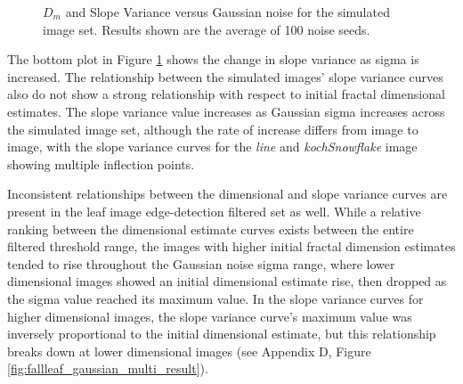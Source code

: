 \documentclass[12pt, oneside]{book}
\begin{document}
\begin{figure}[!b]
  \centering
  \caption[\(D_{m}\) and Slope Variance versus Gaussian noise for the simulated image set.]{\(D_{m}\) and Slope Variance versus Gaussian noise for the simulated image set.  Results shown are the average of 100 noise seeds.}
  \label{fig:simulated_gaussian_multi_result}
\end{figure}

The bottom plot in Figure \ref{fig:simulated_gaussian_multi_result} shows the change in slope variance as sigma is increased.  The relationship between the simulated images' slope variance curves also do not show a strong relationship with respect to initial fractal dimensional estimates.  The slope variance value increases as Gaussian sigma increases across the simulated image set, although the rate of increase differs from image to image, with the slope variance curves for the \textit{line} and \textit{kochSnowflake} image showing multiple inflection points.

Inconsistent relationships between the dimensional and slope variance curves are present in the leaf image edge-detection filtered set as well.  While a relative ranking between the dimensional estimate curves exists between the entire filtered threshold range, the images with higher initial fractal dimension estimates tended to rise throughout the Gaussian noise sigma range, where lower dimensional images showed an initial dimensional estimate rise, then dropped as the sigma value reached its maximum value.  In the slope variance curves for higher dimensional images, the slope variance curve's maximum value was inversely proportional to the initial dimensional estimate, but this relationship breaks down at lower dimensional images (see Appendix D, Figure \ref{fig:fallleaf_gaussian_multi_result}).
\end{document}
